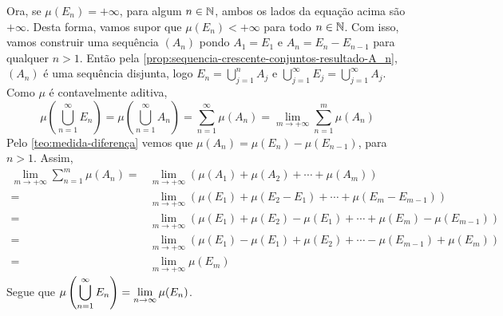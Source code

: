 \begin{prova}
    Ora, se $\mu(E_n) = +\infty$, para algum $n \in \operatorname{\mathbb{N}}$, ambos os lados da equação acima são $+\infty$.
    Desta forma, vamos supor que $\mu(E_n) < +\infty$ para todo $n \in \operatorname{\mathbb{N}}$.
    Com isso, vamos construir uma sequência $(A_n)$ pondo $A_1 = E_1$ e $A_n = E_n - E_{n-1}$ para qualquer $n>1$.
    Então pela \ref{prop:sequencia-crescente-conjuntos-resultado-A_n}, $(A_n)$ é uma sequência disjunta, logo
    $\displaystyle E_n = \bigcup_{j = 1}^n A_j$ e 
    $\displaystyle\bigcup_{j = 1}^\infty E_j = \bigcup_{j = 1}^\infty A_j$.
    Como $\mu$ é contavelmente aditiva, 
    $$\mu\left(\bigcup_{n = 1}^\infty E_n\right)
    =\mu\left(\bigcup_{n = 1}^\infty A_n\right)
    = \sum_{n = 1}^\infty \mu(A_n)
    = \lim_{m \to +\infty}\sum_{n = 1}^m \mu(A_n)$$
    Pelo  \ref{teo:medida-diferença} vemos que $\mu(A_n) = \mu(E_n) - \mu(E_{n - 1 })$, para $n > 1$.
    Assim, 
    \begin{align*}
        \lim_{m \to +\infty}\sum_{n = 1}^m \mu(A_n)
        =&
        \lim_{m \to +\infty}(\mu(A_1) + \mu(A_2) + \cdots +\mu(A_m))\\
        =&
        \lim_{m \to +\infty}(\mu(E_1) + \mu(E_2 - E_1) + \cdots +\mu(E_m - E_{m-1}))\\
        =&
        \lim_{m \to +\infty}(\mu(E_1) + \mu(E_2) - \mu(E_1) + \cdots +\mu(E_m) - \mu(E_{m-1}))\\
        =&
        \lim_{m \to +\infty}(\mu(E_1) - \mu(E_1) + \mu(E_2)  + \cdots  - \mu(E_{m-1}) +\mu(E_m) )\\
        =&
        \lim_{m \to +\infty} \mu(E_m)
    \end{align*}
    Segue que $\mu\left(\displaystyle \bigcup_{n = 1}^\infty E_n\right) = \displaystyle \lim_{n \to \infty} \mu(E_n)$.
\end{prova}

